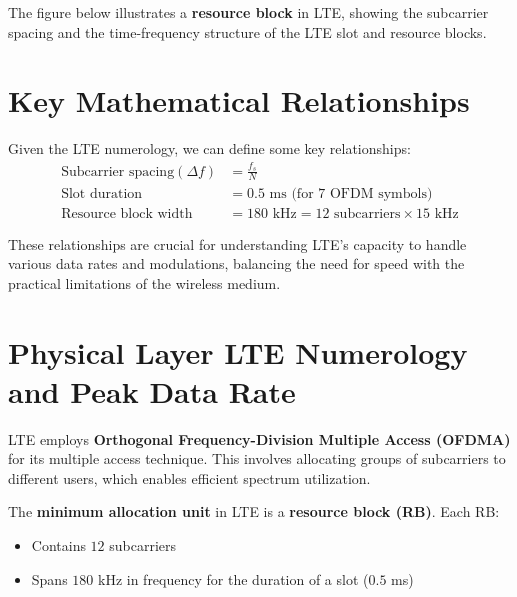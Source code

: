 The figure below illustrates a \textbf{resource block} in LTE, showing the subcarrier spacing and the time-frequency structure of the LTE slot and resource blocks.


\section*{Key Mathematical Relationships}

Given the LTE numerology, we can define some key relationships:
\begin{align*}
    \text{Subcarrier spacing} (\Delta f) &= \frac{f_s}{N} \\
    \text{Slot duration} &= 0.5 \text{ ms (for 7 OFDM symbols)} \\
    \text{Resource block width} &= 180 \text{ kHz} = 12 \text{ subcarriers} \times 15 \text{ kHz}
\end{align*}

These relationships are crucial for understanding LTE's capacity to handle various data rates and modulations, balancing the need for speed with the practical limitations of the wireless medium.



\section*{Physical Layer LTE Numerology and Peak Data Rate}

LTE employs \textbf{Orthogonal Frequency-Division Multiple Access (OFDMA)} for its multiple access technique. This involves allocating groups of subcarriers to different users, which enables efficient spectrum utilization.

The \textbf{minimum allocation unit} in LTE is a \textbf{resource block (RB)}. Each RB:
\begin{itemize}
    \item Contains \(12\) subcarriers
    \item Spans \(180\) kHz in frequency for the duration of a slot (\(0.5\) ms)
\end{itemize}

